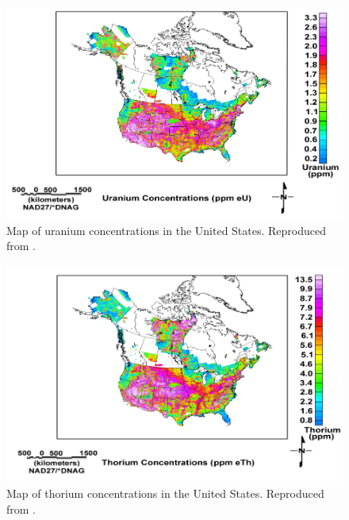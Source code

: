 \begin{figure}[H]
	\centering
	\includegraphics[trim=10 0 5 0, clip, width=1.0\linewidth]{images/USGS_u_conc}
	\caption{Map of uranium concentrations in the United States. Reproduced from \cite{USGS}.}
	\label{fig:USGS_u_conc}
\end{figure}

\begin{figure}[H]
	\centering
	\includegraphics[trim=10 0 5 0, clip, width=1.0\linewidth]{images/USGS_th_conc}
	\caption{Map of thorium concentrations in the United States. Reproduced from \cite{USGS}.}
	\label{fig:USGS_th_conc}
\end{figure}

